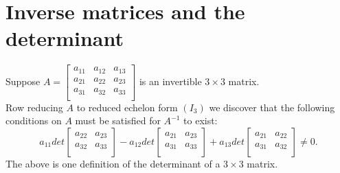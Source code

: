 \documentclass{report}
\begin{document}
  \section{Inverse matrices and the determinant}
          Suppose $A = \begin{bmatrix}
          a_{11} & a_{12} & a_{13}\\
          a_{21} & a_{22} & a_{23}\\
          a_{31} & a_{32} & a_{33}\\
          \end{bmatrix}$ is an invertible $3 \times  3 $ matrix.\\
          Row reducing $ A$ to reduced echelon form $\left( I_3 \right) $ we discover that the following conditions on $A $ must be satisfied for $A^{-1}$ to exist:
          \[
          a_{11} det \begin{bmatrix}
          a_{22} & a_{23}\\
           a_{32}& a_{33}\\
          \end{bmatrix} - a_{12} det \begin{bmatrix}
          a_{21} & a_{23}\\
          a_{31} & a_{33}\\
          \end{bmatrix} + a_{13} det \begin{bmatrix}
          a_{21} & a_{22}\\
          a_{31} & a_{32}\\
          \end{bmatrix}\neq 0
          .\] 
          The above is one definition of the determinant of a $3 \times  3$ matrix.\\
          
          
  
\end{document}
